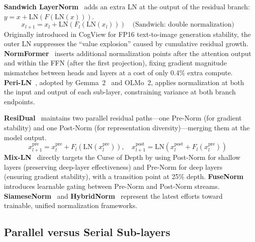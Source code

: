 \textbf{Sandwich LayerNorm}~\cite{ding2021cogview} adds an extra LN at the output of the residual branch: $y = x + \mathrm{LN}(F(\mathrm{LN}(x)))$.
\begin{equation}
x_{l+1} = x_l + \mathrm{LN}\!\left(F_l(\mathrm{LN}(x_l))\right) \quad \text{(Sandwich: double normalization)}
\label{eq:sandwich_ln}
\end{equation}
Originally introduced in CogView for FP16 text-to-image generation stability, the outer LN suppresses the ``value explosion'' caused by cumulative residual growth. \textbf{NormFormer}~\cite{shleifer2022normformer} inserts additional normalization points after the attention output and within the FFN (after the first projection), fixing gradient magnitude mismatches between heads and layers at a cost of only 0.4\% extra compute. \textbf{Peri-LN}~\cite{kim2025periln}, adopted by Gemma~2~\cite{gemma2024improving} and OLMo~2, applies normalization at both the input and output of each sub-layer, constraining variance at both branch endpoints.

\textbf{ResiDual}~\cite{xie2023residual} maintains two parallel residual paths---one Pre-Norm (for gradient stability) and one Post-Norm (for representation diversity)---merging them at the model output.
\begin{equation}
x_{l+1}^{\text{pre}} = x_l^{\text{pre}} + F_l(\mathrm{LN}(x_l^{\text{pre}})), \quad
x_{l+1}^{\text{post}} = \mathrm{LN}(x_l^{\text{post}} + F_l(x_l^{\text{pre}}))
\label{eq:residual}
\end{equation}
\textbf{Mix-LN}~\cite{chen2024mixln} directly targets the Curse of Depth by using Post-Norm for shallow layers (preserving deep-layer effectiveness) and Pre-Norm for deep layers (ensuring gradient stability), with a transition point at 25\% depth. \textbf{FuseNorm}~\cite{wang2026fusenorm} introduces learnable gating between Pre-Norm and Post-Norm streams. \textbf{SiameseNorm}~\cite{siamesenorm2026} and \textbf{HybridNorm}~\cite{hybridnorm2025} represent the latest efforts toward trainable, unified normalization frameworks.

\subsection{Parallel versus Serial Sub-layers}
\label{subsec:parallel_sublayers}

